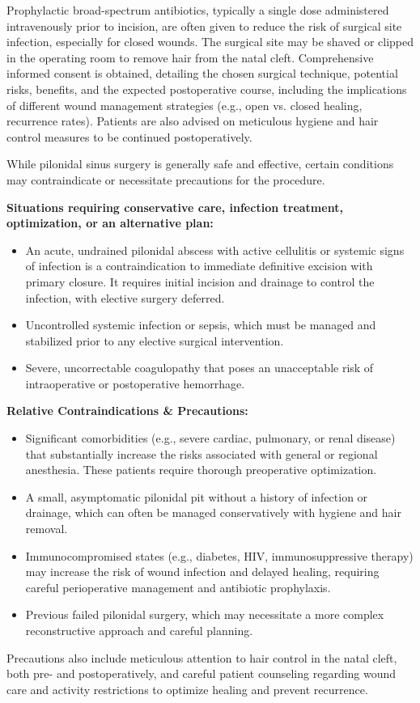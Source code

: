 Prophylactic broad-spectrum antibiotics, typically a single dose administered intravenously prior to incision, are often given to reduce the risk of surgical site infection, especially for closed wounds. The surgical site may be shaved or clipped in the operating room to remove hair from the natal cleft. Comprehensive informed consent is obtained, detailing the chosen surgical technique, potential risks, benefits, and the expected postoperative course, including the implications of different wound management strategies (e.g., open vs. closed healing, recurrence rates). Patients are also advised on meticulous hygiene and hair control measures to be continued postoperatively.

While pilonidal sinus surgery is generally safe and effective, certain conditions may contraindicate or necessitate precautions for the procedure.

\textbf{Situations requiring conservative care, infection treatment, optimization, or an alternative plan:}
\begin{itemize}
  \item An acute, undrained pilonidal abscess with active cellulitis or systemic signs of infection is a contraindication to immediate definitive excision with primary closure. It requires initial incision and drainage to control the infection, with elective surgery deferred.
  \item Uncontrolled systemic infection or sepsis, which must be managed and stabilized prior to any elective surgical intervention.
  \item Severe, uncorrectable coagulopathy that poses an unacceptable risk of intraoperative or postoperative hemorrhage.
\end{itemize}

\textbf{Relative Contraindications \& Precautions:}
\begin{itemize}
  \item Significant comorbidities (e.g., severe cardiac, pulmonary, or renal disease) that substantially increase the risks associated with general or regional anesthesia. These patients require thorough preoperative optimization.
  \item A small, asymptomatic pilonidal pit without a history of infection or drainage, which can often be managed conservatively with hygiene and hair removal.
  \item Immunocompromised states (e.g., diabetes, HIV, immunosuppressive therapy) may increase the risk of wound infection and delayed healing, requiring careful perioperative management and antibiotic prophylaxis.
  \item Previous failed pilonidal surgery, which may necessitate a more complex reconstructive approach and careful planning.
\end{itemize}
Precautions also include meticulous attention to hair control in the natal cleft, both pre- and postoperatively, and careful patient counseling regarding wound care and activity restrictions to optimize healing and prevent recurrence.

